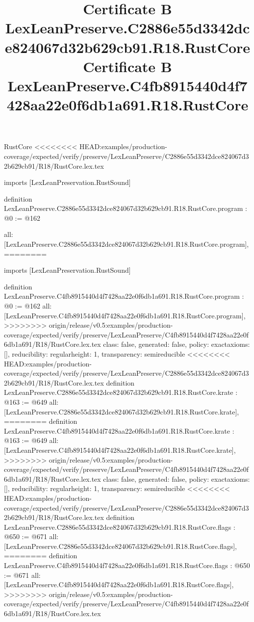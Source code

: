 \begin{lexlean}{RustCore}
<<<<<<<< HEAD:examples/production-coverage/expected/verify/preserve/LexLeanPreserve/C2886e55d3342dce824067d32b629cb91/R18/RustCore.lex.tex
\title{Certificate B LexLeanPreserve.C2886e55d3342dce824067d32b629cb91.R18.RustCore}
\begin{coremodule}
imports [LexLeanPreservation.RustSound]

definition LexLeanPreserve.C2886e55d3342dce824067d32b629cb91.R18.RustCore.program : @0 := @162 {
  all: [LexLeanPreserve.C2886e55d3342dce824067d32b629cb91.R18.RustCore.program],
========
\title{Certificate B LexLeanPreserve.C4fb8915440d4f7428aa22e0f6db1a691.R18.RustCore}
\begin{coremodule}
imports [LexLeanPreservation.RustSound]

definition LexLeanPreserve.C4fb8915440d4f7428aa22e0f6db1a691.R18.RustCore.program : @0 := @162 {
  all: [LexLeanPreserve.C4fb8915440d4f7428aa22e0f6db1a691.R18.RustCore.program],
>>>>>>>> origin/release/v0.5:examples/production-coverage/expected/verify/preserve/LexLeanPreserve/C4fb8915440d4f7428aa22e0f6db1a691/R18/RustCore.lex.tex
  class: false,
  generated: false,
  policy: exact{axioms: []},
  reducibility: regular{height: 1},
  transparency: semireducible
}
<<<<<<<< HEAD:examples/production-coverage/expected/verify/preserve/LexLeanPreserve/C2886e55d3342dce824067d32b629cb91/R18/RustCore.lex.tex
definition LexLeanPreserve.C2886e55d3342dce824067d32b629cb91.R18.RustCore.krate : @163 := @649 {
  all: [LexLeanPreserve.C2886e55d3342dce824067d32b629cb91.R18.RustCore.krate],
========
definition LexLeanPreserve.C4fb8915440d4f7428aa22e0f6db1a691.R18.RustCore.krate : @163 := @649 {
  all: [LexLeanPreserve.C4fb8915440d4f7428aa22e0f6db1a691.R18.RustCore.krate],
>>>>>>>> origin/release/v0.5:examples/production-coverage/expected/verify/preserve/LexLeanPreserve/C4fb8915440d4f7428aa22e0f6db1a691/R18/RustCore.lex.tex
  class: false,
  generated: false,
  policy: exact{axioms: []},
  reducibility: regular{height: 1},
  transparency: semireducible
}
<<<<<<<< HEAD:examples/production-coverage/expected/verify/preserve/LexLeanPreserve/C2886e55d3342dce824067d32b629cb91/R18/RustCore.lex.tex
definition LexLeanPreserve.C2886e55d3342dce824067d32b629cb91.R18.RustCore.flags : @650 := @671 {
  all: [LexLeanPreserve.C2886e55d3342dce824067d32b629cb91.R18.RustCore.flags],
========
definition LexLeanPreserve.C4fb8915440d4f7428aa22e0f6db1a691.R18.RustCore.flags : @650 := @671 {
  all: [LexLeanPreserve.C4fb8915440d4f7428aa22e0f6db1a691.R18.RustCore.flags],
>>>>>>>> origin/release/v0.5:examples/production-coverage/expected/verify/preserve/LexLeanPreserve/C4fb8915440d4f7428aa22e0f6db1a691/R18/RustCore.lex.tex
}}}
\end{coremodule}}
\end{coremodule}
\end{lexlean}
